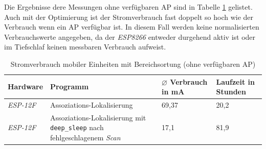 Die Ergebnisse dere Messungen ohne verfügbaren AP sind in Tabelle \ref{table:noapina} gelistet.
Auch mit der Optimierung ist der Stromverbrauch fast doppelt so hoch wie der Verbrauch wenn ein AP verfügbar ist.
In diesem Fall werden keine normalisierten Verbrauchswerte angegeben, da der \emph{ESP8266} entweder durgehend aktiv ist oder im Tiefschlaf keinen messbaren Verbrauch aufweist.

\begin{table}[h!]
	\centering
	\caption{Stromverbrauch mobiler Einheiten mit Bereichsortung (ohne verfügbaren AP)}
	\label{table:noapina}
	\begin{tabular}{l|p{6cm}|p{2.5cm}|p{2.5cm}}
		Hardware & Programm & $\varnothing$ Verbrauch in mA & Laufzeit in Stunden\\
		\hline
		\emph{ESP-12F} & Assoziations-Lokalisierung & 69,37 & 20,2\\
		\emph{ESP-12F} & Assoziations-Lokalisierung mit \texttt{deep\_sleep} nach fehlgeschlagenem \emph{Scan} & 17,1 & 81,9\\
	\end{tabular}
\end{table}


